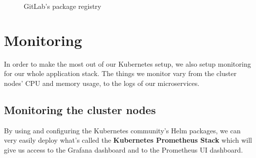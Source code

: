 \begin{figure}[H]
    \centering
    \caption{GitLab's package registry}
    \label{fig:gitlab-package-registry}
\end{figure}
\newpage

\section{Monitoring}
In order to make the most out of our Kubernetes setup, we also setup monitoring for our whole application stack.
The things we monitor vary from the cluster nodes' CPU and memory usage, to the logs of our microservices.

\subsection{Monitoring the cluster nodes}
By using and configuring the Kubernetes community's Helm packages, we can very easily deploy what's called the \textbf{Kubernetes Prometheus Stack} which will give us access to the Grafana dashboard and to the Prometheus UI dashboard.

